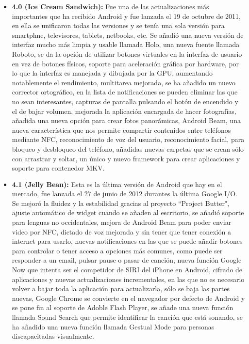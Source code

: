 \begin{itemize}
	\item \textbf{4.0 (Ice Cream Sandwich):} Fue una de las actualizaciones más importantes que ha recibido Android y fue lanzada el 19 de octubre de 2011, en ella se unificaron todas las versiones y se tenía una sola versión para smartphne, televisores, tablets, netbooks, etc. Se añadió una nueva versión de interfaz mucho más limpia y usable llamada Holo, una nueva fuente llamada Roboto, se da la opción de utilizar botones virtuales en la interfaz de usuario en vez de botones físicos, soporte para aceleración gráfica por hardware, por lo que la interfaz es manejada y dibujada por la GPU, aumentando notablemente el rendimiento, multitarea mejorada, se ha añadido un nuevo corrector ortográfico, en la lista de notificaciones se pueden eliminar las que no sean interesantes, capturas de pantalla pulsando el botón de encendido y el de bajar volumen, mejorada la aplicación encargada de hacer fotografías, añadida una nueva opción para crear fotos panorámicas, Android Beam, una nueva característica que nos permite compartir contenidos entre teléfonos mediante NFC, reconocimiento de voz del usuario, reconocimiento facial, para bloqueo y desbloqueo del teléfono, añadidas nuevas carpetas que se crean sólo con arrastrar y soltar, un único y nuevo framework para crear aplicaciones y soporte para contenedor MKV.

	\item \textbf{4.1 (Jelly Bean):} Esta es la última versión de Android que hay en el mercado, fue lanzada el 27 de junio de 2012 durantes la última Google I/O. Se mejoró la fluidez y la estabilidad gracias al proyecto ``Project Butter", ajuste automático de widget cuando se añaden al escritorio, se añadió soporte para lenguas no occidentales, mejora de Android Beam para poder enviar video por NFC, dictado de voz mejorada y sin tener que tener conexión a internet para usarlo, nuevas notificaciones en las que se puede añadir botones para controlar o tener acceso a opciones más comunes, como puede ser responder a un email, pulsar pause o pasar de canción, nueva función Google Now que intenta ser el competidor de SIRI del iPhone en Android, cifrado de aplicaciones y nuevas actualizaciones incrementales, en las que no es necesario volver a bajar toda la aplicación para actualizarla, sólo se baja las partes nuevas, Google Chrome se convierte en el navegador por defecto de Android y se pone fin al soporte de Adoble Flash Player, se añade una nueva función llamada Sound Search que permite identificar la canción que está sonando, se ha añadido una nueva función llamada Gestual Mode para personas discapacitadas visualmente.
\end{itemize}

